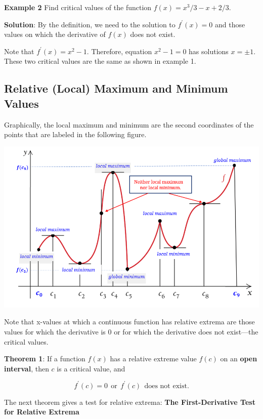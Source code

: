 \documentclass[
]{book}
\begin{document}
\textbf{Example 2} Find critical values of the function \(f(x) = x^3/3 - x + 2/3\).

\textbf{Solution}: By the definition, we need to the solution to \(f^\prime(x) = 0\) and those values on which the derivative of \(f(x)\) does not exist.

Note that \(f^\prime(x) = x^2 - 1\). Therefore, equation \(x^2 -1 = 0\) has solutions \(x = \pm 1\). These two critical values are the same as shown in example 1.

\hfill\break

\hypertarget{relative-local-maximum-and-minimum-values-1}{%
\subsection{Relative (Local) Maximum and Minimum Values}\label{relative-local-maximum-and-minimum-values-1}}

Graphically, the local maximum and minimum are the second coordinates of the points that are labeled in the following figure.

\begin{center}\includegraphics[width=0.8\linewidth]{img08/w08-Extrema} \end{center}

Note that x-values at which a continuous function has relative extrema are those values for which the derivative is 0 or for which the derivative does not exist---the critical values.

\hfill\break
\textbf{Theorem 1}: If a function \(f(x)\) has a relative extreme value \(f(c)\) on an \textbf{open interval}, then \(c\) is a critical value, and

\[
f^\prime(c) = 0 ~~\text{or}~~f^\prime(c) ~~ \text{does not exist.}
\]

The next theorem gives a test for relative extrema: \textbf{The First-Derivative Test for Relative Extrema}
\end{document}
